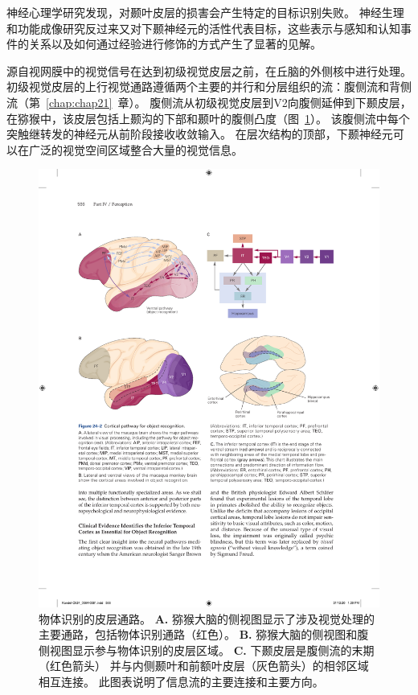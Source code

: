 神经心理学研究发现，对颞叶皮层的损害会产生特定的目标识别失败。
神经生理和功能成像研究反过来又对下颞神经元的活性代表目标，这些表示与感知和认知事件的关系以及如何通过经验进行修饰的方式产生了显著的见解。


源自视网膜中的视觉信号在达到初级视觉皮层之前，在丘脑的外侧核中进行处理。
初级视觉皮层的上行视觉通路遵循两个主要的并行和分层组织的流：腹侧流和背侧流（第~\ref{chap:chap21}~章）。
腹侧流从初级视觉皮层到V2向腹侧延伸到下颞皮层，在猕猴中，该皮层包括上颞沟的下部和颞叶的腹侧凸度（图~\ref{fig:24_2}）。
该腹侧流中每个突触继转发的神经元从前阶段接收收敛输入。
在层次结构的顶部，下颞神经元可以在广泛的视觉空间区域整合大量的视觉信息。


\begin{figure}[htbp]
	\centering
	\includegraphics[width=1.0\linewidth]{chap24/fig_24_2}
	\caption{物体识别的皮层通路。
		\textbf{A.} 猕猴大脑的侧视图显示了涉及视觉处理的主要通路，包括物体识别通路（红色）。
		\textbf{B.} 猕猴大脑的侧视图和腹侧视图显示参与物体识别的皮层区域。
		\textbf{C.} 下颞皮层是腹侧流的末期（红色箭头） 并与内侧颞叶和前额叶皮层（灰色箭头）的相邻区域相互连接。
		此图表说明了信息流的主要连接和主要方向。}
	\label{fig:24_2}
\end{figure}


